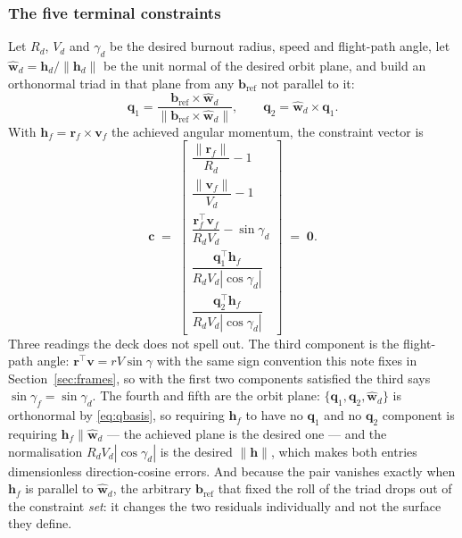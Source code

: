 \documentclass[11pt]{article}
\begin{document}
\subsubsection{The five terminal constraints}
\label{sec:termcon}

Let $R_d$, $V_d$ and $\gamma_d$ be the desired burnout radius, speed and
flight-path angle, let $\hat{\mathbf{w}}_d = \mathbf{h}_d/\|\mathbf{h}_d\|$ be
the unit normal of the desired orbit plane, and build an orthonormal triad in
that plane from any $\mathbf{b}_{\text{ref}}$ not parallel to it:
\begin{equation}
  \mathbf{q}_1 = \frac{\mathbf{b}_{\text{ref}}\times\hat{\mathbf{w}}_d}
                      {\|\mathbf{b}_{\text{ref}}\times\hat{\mathbf{w}}_d\|},
  \qquad
  \mathbf{q}_2 = \hat{\mathbf{w}}_d\times\mathbf{q}_1 .
  \label{eq:qbasis}
\end{equation}
With $\mathbf{h}_f = \mathbf{r}_f\times\mathbf{v}_f$ the achieved angular
momentum, the constraint vector is
\begin{equation}
  \mathbf{c} \;=\;
  \begin{bmatrix}
    \dfrac{\|\mathbf{r}_f\|}{R_d} - 1 \\[8pt]
    \dfrac{\|\mathbf{v}_f\|}{V_d} - 1 \\[8pt]
    \dfrac{\mathbf{r}_f^{\!\top}\mathbf{v}_f}{R_dV_d} - \sin\gamma_d \\[8pt]
    \dfrac{\mathbf{q}_1^{\!\top}\mathbf{h}_f}{R_dV_d|\cos\gamma_d|} \\[8pt]
    \dfrac{\mathbf{q}_2^{\!\top}\mathbf{h}_f}{R_dV_d|\cos\gamma_d|}
  \end{bmatrix}
  \;=\; \mathbf{0} .
  \label{eq:termcon}
\end{equation}
Three readings the deck does not spell out. The third component is the
flight-path angle: $\mathbf{r}^{\!\top}\mathbf{v} = rV\sin\gamma$ with the same
sign convention this note fixes in Section~\ref{sec:frames}, so with the first
two components satisfied the third says $\sin\gamma_f = \sin\gamma_d$. The
fourth and fifth are the orbit plane: $\{\mathbf{q}_1,\mathbf{q}_2,
\hat{\mathbf{w}}_d\}$ is orthonormal by \eqref{eq:qbasis}, so requiring
$\mathbf{h}_f$ to have no $\mathbf{q}_1$ and no $\mathbf{q}_2$ component is
requiring $\mathbf{h}_f \parallel \hat{\mathbf{w}}_d$ --- the achieved plane is
the desired one --- and the normalisation $R_dV_d|\cos\gamma_d|$ is the desired
$\|\mathbf{h}\|$, which makes both entries dimensionless direction-cosine
errors. And because the pair vanishes exactly when $\mathbf{h}_f$ is parallel
to $\hat{\mathbf{w}}_d$, the arbitrary $\mathbf{b}_{\text{ref}}$ that fixed the
roll of the triad drops out of the constraint \emph{set}: it changes the two
residuals individually and not the surface they define.
\end{document}
